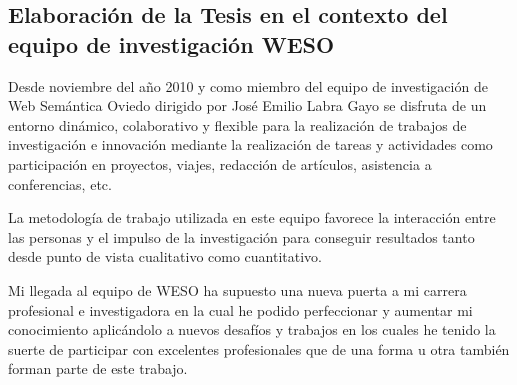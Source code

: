 \subsection{Elaboración de la Tesis en el contexto del equipo de investigación WESO}
Desde noviembre del año 2010 y como miembro del equipo de investigación de Web Semántica Oviedo dirigido por José 
Emilio Labra Gayo se disfruta de un entorno dinámico, colaborativo y flexible para la realización de trabajos 
de investigación e innovación mediante la realización de tareas y actividades como participación en proyectos, 
viajes, redacción de artículos, asistencia a conferencias, etc. 

La metodología de trabajo utilizada en este equipo favorece la interacción entre las personas y 
el impulso de la investigación para conseguir resultados tanto desde punto de vista cualitativo 
como cuantitativo. 

Mi llegada al equipo de \gls{WESO} ha supuesto una nueva puerta a mi carrera profesional e investigadora 
en la cual he podido perfeccionar y aumentar mi conocimiento aplicándolo a nuevos desafíos y trabajos 
en los cuales he tenido la suerte de participar con excelentes profesionales que de una forma 
u otra también forman parte de este trabajo.

